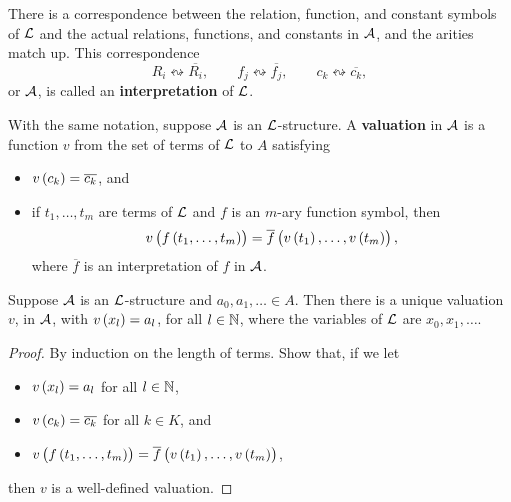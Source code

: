There is a correspondence between the relation, function, and constant symbols of $ \LL $ and the actual relations, functions, and constants in $ \AA $, and the arities match up. This correspondence
$$ R_i \leftrightsquigarrow \overline{R_i}, \qquad f_j \leftrightsquigarrow \overline{f_j}, \qquad c_k \leftrightsquigarrow \overline{c_k}, $$
or $ \AA $, is called an \textbf{interpretation} of $ \LL $.

\begin{definition}
With the same notation, suppose $ \AA $ is an $ \LL $-structure. A \textbf{valuation} in $ \AA $ is a function $ v $ from the set of terms of $ \LL $ to $ A $ satisfying
\begin{itemize}
\item $ v\br{c_k} = \overline{c_k} $, and
\item if $ t_1, \dots, t_m $ are terms of $ \LL $ and $ f $ is an $ m $-ary function symbol, then
$$ v\br{f\br{t_1, \dots, t_m}} = \overline{f}\br{v\br{t_1}, \dots, v\br{t_m}}, $$
where $ \overline{f} $ is an interpretation of $ f $ in $ \AA $.
\end{itemize}
\end{definition}

\begin{lemma}
Suppose $ \AA $ is an $ \LL $-structure and $ a_0, a_1, \dots \in A $. Then there is a unique valuation $ v $, in $ \AA $, with $ v\br{x_l} = a_l $, for all $ l \in \N $, where the variables of $ \LL $ are $ x_0, x_1, \dots $.
\end{lemma}

\begin{proof}
By induction on the length of terms. Show that, if we let
\begin{itemize}
\item $ v\br{x_l} = a_l $ for all $ l \in \N $,
\item $ v\br{c_k} = \overline{c_k} $ for all $ k \in K $, and
\item $ v\br{f\br{t_1, \dots, t_m}} = \overline{f}\br{v\br{t_1}, \dots, v\br{t_m}} $,
\end{itemize}
then $ v $ is a well-defined valuation.
\end{proof}

